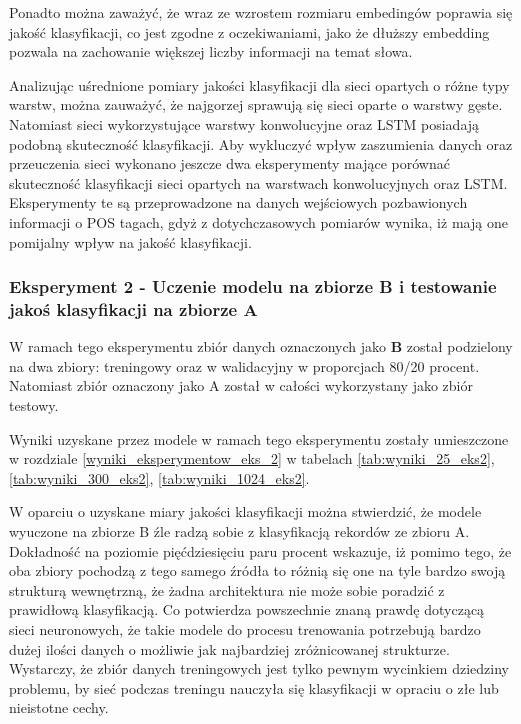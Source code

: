 Ponadto można zaważyć, że wraz ze wzrostem rozmiaru embedingów poprawia się jakość klasyfikacji, co jest zgodne z oczekiwaniami, jako że dłuższy embedding pozwala na zachowanie większej liczby informacji na temat słowa.


Analizując uśrednione pomiary jakości klasyfikacji dla sieci opartych o różne typy warstw, można zauważyć, że najgorzej sprawują się sieci oparte o warstwy gęste. Natomiast sieci wykorzystujące warstwy konwolucyjne oraz LSTM posiadają podobną skuteczność klasyfikacji. Aby wykluczyć wpływ zaszumienia danych oraz przeuczenia sieci wykonano jeszcze dwa eksperymenty mające porównać skuteczność klasyfikacji sieci opartych na warstwach konwolucyjnych oraz LSTM. Eksperymenty te są przeprowadzone na danych wejściowych pozbawionych informacji o POS tagach, gdyż z dotychczasowych pomiarów wynika, iż mają one pomijalny wpływ na jakość klasyfikacji.


\subsubsection{Eksperyment 2 - Uczenie modelu na zbiorze B i testowanie jakoś klasyfikacji na zbiorze A }

W ramach tego eksperymentu zbiór danych oznaczonych jako \textbf{B} został podzielony na dwa zbiory: treningowy oraz w walidacyjny w proporcjach 80/20 procent. Natomiast zbiór oznaczony jako A został w całości wykorzystany jako zbiór testowy.

Wyniki uzyskane przez modele w ramach tego eksperymentu zostały umieszczone w rozdziale \ref{wyniki_eksperymentow_eks_2} w tabelach \ref{tab:wyniki_25_eks2}, \ref{tab:wyniki_300_eks2}, \ref{tab:wyniki_1024_eks2}.


W oparciu o uzyskane miary jakości klasyfikacji można stwierdzić, że modele wyuczone na zbiorze B źle radzą sobie z klasyfikacją rekordów ze zbioru A. Dokładność na poziomie pięćdziesięciu paru procent wskazuje, iż pomimo tego, że oba zbiory pochodzą z tego samego źródła to różnią się one na tyle bardzo swoją strukturą wewnętrzną, że żadna architektura nie może sobie poradzić z prawidłową klasyfikacją. Co potwierdza powszechnie znaną prawdę dotyczącą sieci neuronowych, że takie modele do procesu trenowania potrzebują bardzo dużej ilości danych o możliwie jak najbardziej zróżnicowanej strukturze. Wystarczy, że zbiór danych treningowych jest tylko pewnym wycinkiem dziedziny problemu, by sieć podczas treningu nauczyła się klasyfikacji w opraciu o złe lub nieistotne cechy.


